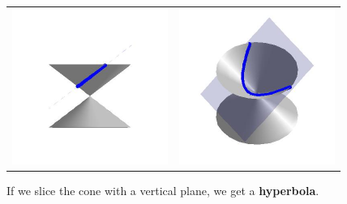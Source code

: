 \documentclass{ximera}
\begin{document}
\begin{center}

\begin{tabular}{cc}

\includegraphics[width=2in]{./IntrotoConicsGraphics/Parabola01.jpg} & \includegraphics[width=2in]{./IntrotoConicsGraphics/Parabola02.jpg} \\

\end{tabular}

\end{center}

If we slice the cone with a vertical plane, we get a  \textbf{hyperbola}.
\end{document}
